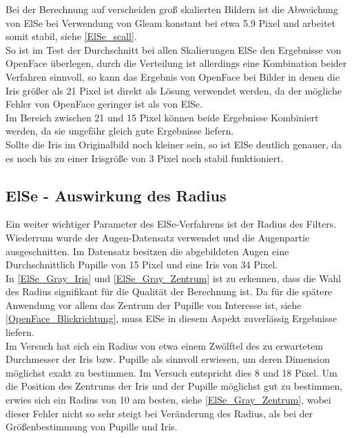 Bei der Berechnung auf verscheiden groß skalierten Bildern ist die Abweichung von ElSe bei Verwendung von Gleam konstant bei etwa 5.9 Pixel und arbeitet somit stabil, siehe \autoref{ElSe_scall}.\\
So ist im Test der Durchschnitt bei allen Skalierungen ElSe den Ergebnisse von OpenFace überlegen, durch die Verteilung ist allerdings eine Kombination beider Verfahren sinnvoll, so kann das Ergebnis von OpenFace bei Bilder in denen die Iris größer als 21 Pixel ist direkt als Lösung verwendet werden, da der mögliche Fehler von OpenFace geringer ist als von ElSe.\\
Im Bereich zwischen 21 und 15 Pixel können beide Ergebnisse Kombiniert werden, da sie ungefähr gleich gute Ergebnisse liefern.\\
Sollte die Iris im Originalbild noch kleiner sein, so ist ElSe deutlich genauer, da es noch bis zu einer Irisgröße von 3 Pixel noch stabil funktioniert.
\subsection{ElSe - Auswirkung des Radius}
Ein weiter wichtiger Parameter des ElSe-Verfahrens ist der Radius des Filters. Wiederrum wurde der Augen-Datensatz \cite{database_Eye} verwendet und die Augenpartie ausgeschnitten. Im Datensatz besitzen die abgebildeten Augen eine Durchschnittlich Pupille von 15 Pixel und eine Iris von 34 Pixel.\\
In \autoref{ElSe_Gray_Iris} und \autoref{ElSe_Gray_Zentrum} ist zu erkennen, dass die Wahl des Radius signifikant für die Qualität der Berechnung ist. Da für die spätere Anwendung vor allem das Zentrum der Pupille von Interesse ist, siehe \autoref{OpenFace_Blickrichtung}, muss ElSe in diesem Aspekt zuverlässig Ergebnisse liefern.\\
Im Versuch hat sich ein Radius von etwa einem Zwölftel des zu erwartetem Durchmesser der Iris bzw. Pupille als sinnvoll erwiesen, um deren Dimension möglichst exakt zu bestimmen. Im Versuch entspricht dies 8 und 18 Pixel. Um die Position des Zentrums  der Iris und der Pupille möglichst gut zu bestimmen, erwies sich ein Radius von 10 am besten, siehe \autoref{ElSe_Gray_Zentrum}, wobei dieser Fehler nicht so sehr steigt bei Veränderung des Radius, als bei der Größenbestimmung von Pupille und Iris.
